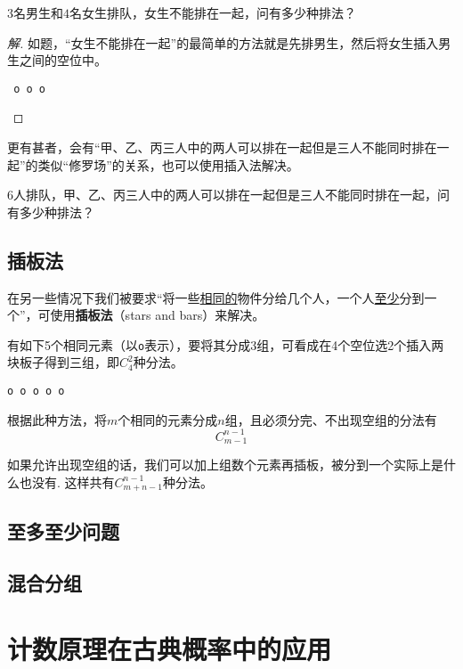 \begin{example}
	$3$名男生和$4$名女生排队，女生不能排在一起，问有多少种排法？
\end{example}

\begin{proof}[解]
	如题，“女生不能排在一起”的最简单的方法就是先排男生，然后将女生插入男生之间的空位中。

	\begin{center}
		\verb*| o o o |
	\end{center}
\end{proof}

更有甚者，会有“甲、乙、丙三人中的两人可以排在一起但是三人不能同时排在一起”的类似“修罗场”的关系，也可以使用插入法解决。

\begin{example}
	$6$人排队，甲、乙、丙三人中的两人可以排在一起但是三人不能同时排在一起，问有多少种排法？
\end{example}

\subsection{插板法}
在另一些情况下我们被要求“将一些\uline{相同的}物件分给几个人，一个人\uline{至少}分到一个”，可使用\textbf{插板法}（stars and bars）来解决。

有如下5个相同元素（以\verb|o|表示），要将其分成3组，可看成在4个空位选2个插入两块板子得到三组，即$C_4^2$种分法。

\begin{center}
	\verb*|o o o o o|
\end{center}

根据此种方法，将$m$个相同的元素分成$n$组，且必须分完、不出现空组的分法有\[C_{m-1}^{n-1}\]

如果允许出现空组的话，我们可以加上组数个元素再插板，被分到一个实际上是什么也没有. 这样共有$C_{m+n-1}^{n-1}$种分法。

\subsection{至多至少问题}

\subsection{混合分组}

\section[概率]{计数原理在古典概率中的应用}
